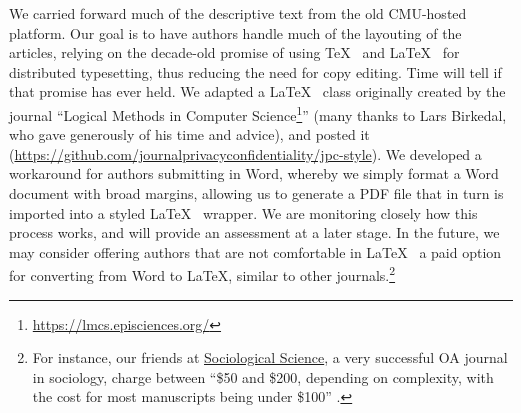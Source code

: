 \documentclass{jpcfinal} %
\newcommand{\urlcite}[2]{#2\footnote{\url{#1}}}
\begin{document}
We carried forward much of the descriptive text from the old CMU-hosted platform. Our goal is to have authors handle much of the layouting of the articles, relying on the decade-old promise of using \TeX~ \citep{Knuth1986} and \LaTeX~ \citep{Lamport1986} for distributed typesetting, thus reducing the need for copy editing. Time will tell if that promise has ever held. We adapted a \LaTeX~ class originally created by the journal ``\urlcite{https://lmcs.episciences.org/}{Logical Methods in Computer Science}'' (many thanks to Lars Birkedal, who gave generously of his time and advice), and posted it (\url{https://github.com/journalprivacyconfidentiality/jpc-style}). We developed a workaround for authors submitting in Word, whereby we simply format a Word document with broad margins, allowing us to generate a PDF file that in turn is imported into a styled \LaTeX~ wrapper. We are monitoring closely how this process works, and will provide an assessment at a later stage. In the future, we may consider offering authors that are not comfortable in \LaTeX~ a paid option for converting from Word to \LaTeX, similar to other journals.\footnote{For instance, our friends at \href{https://www.sociologicalscience.com/}{Sociological Science}, a very successful OA journal in sociology, charge between  ``\$50 and \$200, depending on complexity, with the cost for most manuscripts being under \$100'' \citep{SociologicalScience2018}. }
\end{document}
